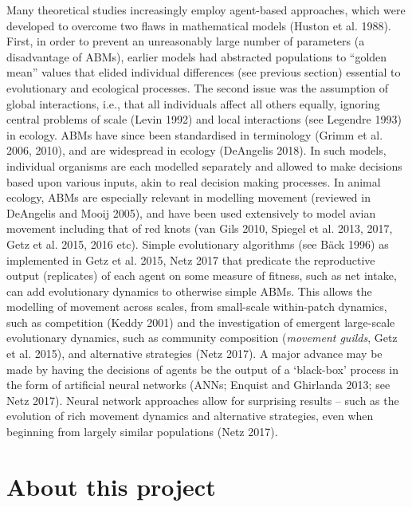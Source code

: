 \documentclass[]{scrartcl}
\begin{document}
\begin{linenumbers}
Many theoretical studies increasingly employ agent-based approaches,
which were developed to overcome two flaws in mathematical models
(Huston et al. 1988). First, in order to prevent an unreasonably large
number of parameters (a disadvantage of ABMs), earlier models had
abstracted populations to ``golden mean'' values that elided individual
differences (see previous section) essential to evolutionary and
ecological processes. The second issue was the assumption of global
interactions, i.e., that all individuals affect all others equally,
ignoring central problems of scale (Levin 1992) and local interactions
(see Legendre 1993) in ecology. ABMs have since been standardised in
terminology (Grimm et al. 2006, 2010), and are widespread in ecology
(DeAngelis 2018). In such models, individual organisms are each modelled
separately and allowed to make decisions based upon various inputs, akin
to real decision making processes. In animal ecology, ABMs are
especially relevant in modelling movement (reviewed in DeAngelis and
Mooij 2005), and have been used extensively to model avian movement
including that of red knots (van Gils 2010, Spiegel et al. 2013, 2017,
Getz et al. 2015, 2016 etc). Simple evolutionary algorithms (see
\protect\hypertarget{ZOTERO_BREF_6WhVYsaNgj9a}{}{\protect\hypertarget{__UnoMark__44517_2549695377}{}{\protect\hypertarget{__UnoMark__39640_623588325}{}{\protect\hypertarget{__UnoMark__53945_4107183634}{}{}}}}Bäck
1996) as implemented in Getz et al. 2015, Netz 2017 that predicate the
reproductive output (replicates) of each agent on some measure of
fitness, such as net intake, can add evolutionary dynamics to otherwise
simple ABMs. This allows the modelling of movement across scales, from
small-scale within-patch dynamics, such as competition (Keddy 2001) and
the investigation of emergent large-scale evolutionary dynamics, such as
community composition (\emph{movement guilds}, Getz et al. 2015), and
alternative strategies (Netz 2017). A major advance may be made by
having the decisions of agents be the output of a `black-box' process in
the form of artificial neural networks (ANNs; Enquist and Ghirlanda
2013; see Netz 2017). Neural network approaches allow for surprising
results -- such as the evolution of rich movement dynamics and
alternative strategies, even when beginning from largely similar
populations (Netz 2017).

\newpage

\part{About this project}\label{about-this-project}


\end{linenumbers}
\end{document}

